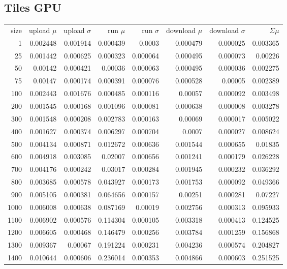 \subsection*{Tiles GPU}

\begin{longtable}{r r r r r r r r}
size & upload $\mu$  & upload $\sigma$ & run $\mu$ & run $\sigma$ & download $\mu$ & download $\sigma$ & $\Sigma \mu$ \\
1 & 0.002448 & 0.001914 & 0.000439 & 0.0003 & 0.000479 & 0.000025 & 0.003365 \\
25 & 0.001442 & 0.000625 & 0.000323 & 0.000064 & 0.000495 & 0.000073 & 0.00226 \\
50 & 0.00142 & 0.000421 & 0.00036 & 0.000063 & 0.000495 & 0.000036 & 0.002275 \\
75 & 0.00147 & 0.000174 & 0.000391 & 0.000076 & 0.000528 & 0.00005 & 0.002389 \\
100 & 0.002443 & 0.001676 & 0.000485 & 0.000116 & 0.00057 & 0.000092 & 0.003498 \\
200 & 0.001545 & 0.000168 & 0.001096 & 0.000081 & 0.000638 & 0.000008 & 0.003278 \\
300 & 0.001548 & 0.000208 & 0.002783 & 0.000163 & 0.00069 & 0.000017 & 0.005022 \\
400 & 0.001627 & 0.000374 & 0.006297 & 0.000704 & 0.0007 & 0.000027 & 0.008624 \\
500 & 0.004134 & 0.000871 & 0.012672 & 0.000636 & 0.001544 & 0.000655 & 0.01835 \\
600 & 0.004918 & 0.003085 & 0.02007 & 0.000656 & 0.001241 & 0.000179 & 0.026228 \\
700 & 0.004176 & 0.000242 & 0.03017 & 0.000284 & 0.001945 & 0.000232 & 0.036292 \\
800 & 0.003685 & 0.000578 & 0.043927 & 0.000173 & 0.001753 & 0.000092 & 0.049366 \\
900 & 0.005105 & 0.000381 & 0.064656 & 0.000157 & 0.00251 & 0.000281 & 0.07227 \\
1000 & 0.006008 & 0.000638 & 0.087169 & 0.00019 & 0.002756 & 0.000313 & 0.095933 \\
1100 & 0.006902 & 0.000576 & 0.114304 & 0.000105 & 0.003318 & 0.000413 & 0.124525 \\
1200 & 0.006605 & 0.000468 & 0.146479 & 0.000256 & 0.003784 & 0.001259 & 0.156868 \\
1300 & 0.009367 & 0.00067 & 0.191224 & 0.000231 & 0.004236 & 0.000574 & 0.204827 \\
1400 & 0.010644 & 0.000606 & 0.236014 & 0.000353 & 0.004866 & 0.000603 & 0.251525 \\

\end{longtable}
